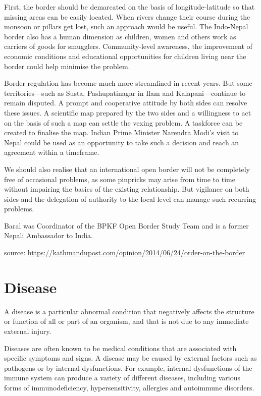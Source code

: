 \documentclass[
  openany]{book}
\begin{document}
First, the border should be demarcated on the basis of longitude-latitude so that missing areas can be easily located. When rivers change their course during the monsoon or pillars get lost, such an approach would be useful. The Indo-Nepal border also has a human dimension as children, women and others work as carriers of goods for smugglers. Community-level awareness, the improvement of economic conditions and educational opportunities for children living near the border could help minimise the problem.

Border regulation has become much more streamlined in recent years. But some territories---such as Susta, Pashupatinagar in Ilam and Kalapani---continue to remain disputed. A prompt and cooperative attitude by both sides can resolve these issues. A scientific map prepared by the two sides and a willingness to act on the basis of such a map can settle the vexing problem. A taskforce can be created to finalise the map. Indian Prime Minister Narendra Modi's visit to Nepal could be used as an opportunity to take such a decision and reach an agreement within a timeframe.

We should also realise that an international open border will not be completely free of occasional problems, as some pinpricks may arise from time to time without impairing the basics of the existing relationship. But vigilance on both sides and the delegation of authority to the local level can manage such recurring problems.

Baral was Coordinator of the BPKF Open Border Study Team and is a former Nepali Ambassador to India.

source: \url{https://kathmandupost.com/opinion/2014/06/24/order-on-the-border}

\hypertarget{disease}{%
\section{Disease}\label{disease}}

A disease is a particular abnormal condition that negatively affects the structure or function of all or part of an organism, and that is not due to any immediate external injury.

Diseases are often known to be medical conditions that are associated with specific symptoms and signs. A disease may be caused by external factors such as pathogens or by internal dysfunctions. For example, internal dysfunctions of the immune system can produce a variety of different diseases, including various forms of immunodeficiency, hypersensitivity, allergies and autoimmune disorders.
\end{document}
